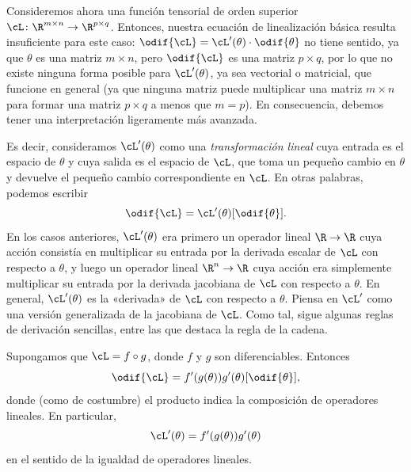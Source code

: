 \documentclass[../../book-main_es.tex]{subfiles}
\begin{document}
Consideremos ahora una función tensorial de orden superior \(\cL \colon \R^{m \times
n} \to \R^{p \times q}\). Entonces, nuestra ecuación de linealización básica
resulta insuficiente para este caso: \(\odif{\cL} = \cL^{\prime}(\theta) \cdot
\odif{\theta}\) no tiene sentido, ya que \(\theta\) es una matriz \(m \times
n\), pero \(\odif{\cL}\) es una matriz \(p \times q\), por lo que no existe 
ninguna forma posible para \(\cL^{\prime}(\theta)\), ya sea vectorial o matricial, que 
funcione en general (ya que ninguna matriz puede multiplicar una matriz \(m \times n\)
para formar una matriz \(p \times q\) a menos que \(m = p\)). En consecuencia, debemos tener una
interpretación ligeramente más avanzada.

Es decir, consideramos \(\cL^{\prime}(\theta)\) como una \textit{transformación lineal}
cuya entrada es el espacio de \(\theta\) y cuya salida es
el espacio de \(\cL\), que toma un pequeño cambio en \(\theta\) y
devuelve el pequeño cambio correspondiente en \(\cL\). En otras palabras, podemos escribir
\begin{equation}
    \odif{\cL} = \cL^{\prime}(\theta)[\odif{\theta}].
\end{equation}
En los casos anteriores, \(\cL^{\prime}(\theta)\) era primero un operador lineal \(\R \to \R\)
cuya acción consistía en multiplicar su entrada por la
derivada escalar de \(\cL\) con respecto a \(\theta\), y luego un
operador lineal \(\R^{n} \to \R\) cuya acción era simplemente multiplicar su
entrada por la derivada jacobiana de \(\cL\) con respecto a
\(\theta\). En general, \(\cL^{\prime}(\theta)\) es la «derivada»
de \(\cL\) con respecto a \(\theta\).
Piensa en \(\cL^{\prime}\) como una versión generalizada de la jacobiana de \(\cL\).
Como tal, sigue algunas reglas de derivación sencillas, entre las que destaca la regla de la cadena.

\begin{theorem}
    Supongamos que \(\cL = f \circ g\), donde \(f\) y \(g\) son diferenciables. Entonces
    \begin{equation}
        \odif{\cL} = f^{\prime}(g(\theta))g^{\prime}(\theta)[\odif{\theta}],
    \end{equation}
    donde (como de costumbre) el producto indica la composición de operadores lineales.
    En particular,
    \begin{equation}
        \cL^{\prime}(\theta) = f^{\prime}(g(\theta))g^{\prime}(\theta)
    \end{equation}
    en el sentido de la igualdad de operadores lineales.
\end{theorem}
\end{document}
